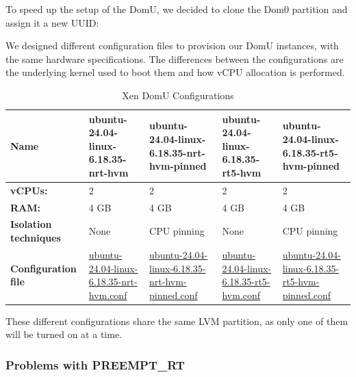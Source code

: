 To speed up the setup of the DomU, we decided to clone the Dom0
partition and assign it a new UUID:

\begin{Shaded}
\begin{Highlighting}[]
\end{Highlighting}
\end{Shaded}

We designed different configuration files to provision our DomU
instances, with the same hardware specifications. The differences
between the configurations are the underlying kernel used to boot them
and how vCPU allocation is performed.

\begin{table}
\centering
\caption{Xen DomU Configurations}
\label{tab:setup:xen-domu}
\begin{tabularx}{\linewidth}{@{}YYYYY@{}}
\toprule
Name & ubuntu-24.04-linux-6.18.35-nrt-hvm & ubuntu-24.04-linux-6.18.35-nrt-hvm-pinned & ubuntu-24.04-linux-6.18.35-rt5-hvm & ubuntu-24.04-linux-6.18.35-rt5-hvm-pinned\tabularnewline
\midrule
\textbf{vCPUs:} & 2 & 2 & 2 & 2\tabularnewline
\textbf{RAM:} & 4 GB & 4 GB & 4 GB & 4 GB\tabularnewline
\textbf{Isolation techniques} & None & CPU pinning & None & CPU pinning\tabularnewline
\textbf{Configuration file} & \href{Xen/domains/ubuntu-24.04-linux-6.18.35-nrt-hvm.conf}{ubuntu-24.04-linux-6.18.35-nrt-hvm.conf} & \href{Xen/domains/ubuntu-24.04-linux-6.18.35-nrt-hvm-pinned.conf}{ubuntu-24.04-linux-6.18.35-nrt-hvm-pinned.conf} & \href{Xen/domains/ubuntu-24.04-linux-6.18.35-rt5-hvm.conf}{ubuntu-24.04-linux-6.18.35-rt5-hvm.conf} & \href{Xen/domains/ubuntu-24.04-linux-6.18.35-rt5-hvm-pinned.conf}{ubuntu-24.04-linux-6.18.35-rt5-hvm-pinned.conf}\tabularnewline
\bottomrule
\end{tabularx}
\end{table}

These different configurations share the same LVM partition, as only one
of them will be turned on at a time.

\subsubsection{Problems with
PREEMPT\_RT}\label{problems-with-preempt_rt}


